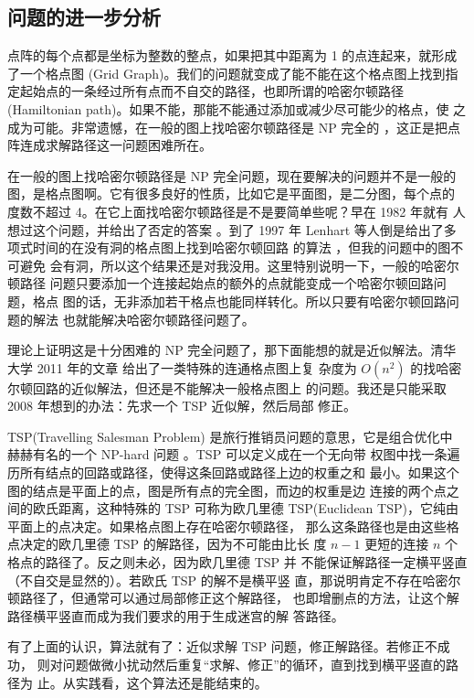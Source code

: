 \documentclass[cs4size,a4paper,adobefonts]{ctexart}
\begin{document}
\subsection{问题的进一步分析}

点阵的每个点都是坐标为整数的整点，如果把其中距离为 1 的点连起来，就形成
了一个格点图 (Grid Graph)。我们的问题就变成了能不能在这个格点图上找到指
定起始点的一条经过所有点而不自交的路径，也即所谓的哈密尔顿路径
(Hamiltonian path)。如果不能，那能不能通过添加或减少尽可能少的格点，使
之成为可能。非常遗憾，在一般的图上找哈密尔顿路径是 NP 完全的
\cite{Garey:1979:CIG:578533}，这正是把点阵连成求解路径这一问题困难所在。

在一般的图上找哈密尔顿路径是 NP 完全问题，现在要解决的问题并不是一般的
图，是格点图啊。它有很多良好的性质，比如它是平面图，是二分图，每个点的
度数不超过 4。在它上面找哈密尔顿路径是不是要简单些呢？早在 1982 年就有
人想过这个问题，并给出了否定的答案 \cite{citeulike:1905588}。到了 1997
年 Lenhart 等人倒是给出了多项式时间的在没有洞的格点图上找到哈密尔顿回路
的算法 \cite{Lenhart:1997:HCS:795663.796334}，但我的问题中的图不可避免
会有洞，所以这个结果还是对我没用。这里特别说明一下，一般的哈密尔顿路径
问题只要添加一个连接起始点的额外的点就能变成一个哈密尔顿回路问题，格点
图的话，无非添加若干格点也能同样转化。所以只要有哈密尔顿回路问题的解法
也就能解决哈密尔顿路径问题了。

理论上证明这是十分困难的 NP 完全问题了，那下面能想的就是近似解法。清华
大学 2011 年的文章 \cite{Zhang20115340} 给出了一类特殊的连通格点图上复
杂度为 $O(n^2)$ 的找哈密尔顿回路的近似解法，但还是不能解决一般格点图上
的问题。我还是只能采取 2008 年想到的办法：先求一个 TSP 近似解，然后局部
修正。

TSP(Travelling Salesman Problem) 是旅行推销员问题的意思，它是组合优化中
赫赫有名的一个 NP-hard 问题 \cite{wiki:TSP}。TSP 可以定义成在一个无向带
权图中找一条遍历所有结点的回路或路径，使得这条回路或路径上边的权重之和
最小。如果这个图的结点是平面上的点，图是所有点的完全图，而边的权重是边
连接的两个点之间的欧氏距离，这种特殊的 TSP 可称为欧几里德
TSP(Euclidean TSP)，它纯由平面上的点决定。如果格点图上存在哈密尔顿路径，
那么这条路径也是由这些格点决定的欧几里德 TSP 的解路径，因为不可能由比长
度 $n-1$ 更短的连接 $n$ 个格点的路径了。反之则未必，因为欧几里德 TSP 并
不能保证解路径一定横平竖直（不自交是显然的）。若欧氏 TSP 的解不是横平竖
直，那说明肯定不存在哈密尔顿路径了，但通常可以通过局部修正这个解路径，
也即增删点的方法，让这个解路径横平竖直而成为我们要求的用于生成迷宫的解
答路径。

有了上面的认识，算法就有了：近似求解 TSP 问题，修正解路径。若修正不成功，
则对问题做微小扰动然后重复“求解、修正”的循环，直到找到横平竖直的路径为
止。从实践看，这个算法还是能结束的。



\end{document}
